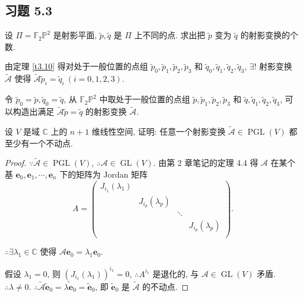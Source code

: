 \documentclass{ctexart}
\begin{document}
\subsection{习题 5.3}
\begin{exercise}%
    设 $\varPi=\mathbb{F}_2\mathbb{P}^2$ 是射影平面, $\tilde{p},\tilde{q}$ 是 $\varPi$ 上不同的点. 求出把 $\tilde{p}$ 变为 $\tilde{q}$ 的射影变换的个数.
\end{exercise}
\begin{solution}
    由定理 \ref{t3.10} 得对处于一般位置的点组 $\tilde{p}_0,\tilde{p}_1,\tilde{p}_2,\tilde{p}_3$ 和 $\tilde{q}_0,\tilde{q}_1,\tilde{q}_2,\tilde{q}_3$, $\exists!$ 射影变换 $\widetilde{\mathcal{A}}$ 使得 $\widetilde{\mathcal{A}}\tilde{p}_i=\tilde{q}_i\ (i=0,1,2,3)$.

    令 $\tilde{p}_0=\tilde{p},\tilde{q}_0=\tilde{q}$, 从 $\mathbb{F}_2\mathbb{P}^2$ 中取处于一般位置的点组 $\tilde{p},\tilde{p}_1,\tilde{p}_2,\tilde{p}_3$ 和 $\tilde{q},\tilde{q}_1,\tilde{q}_2,\tilde{q}_3$, 可以构造出满足 $\widetilde{\mathcal{A}}\tilde{p}=\tilde{q}$ 的射影变换 $\widetilde{\mathcal{A}}$.
\end{solution}
\begin{exercise}%
    设 $V$ 是域 $\mathbb{C}$ 上的 $n+1$ 维线性空间, 证明: 任意一个射影变换 $\widetilde{\mathcal{A}}\in\operatorname{PGL}(V)$ 都至少有一个不动点.
\end{exercise}
\begin{proof}
    $\because\widetilde{\mathcal{A}}\in\operatorname{PGL}(V)$, $\therefore\mathcal{A}\in\operatorname{GL}(V)$. 由第 2 章笔记的定理 4.4 得 $\mathcal{A}$ 在某个基 $\boldsymbol{e}_0,\boldsymbol{e}_1,\cdots,\boldsymbol{e}_n$ 下的矩阵为 Jordan 矩阵
    \[A=\begin{pmatrix}
        J_{i_1}(\lambda_1) \\
        & J_{i_p}(\lambda_p) \\
        && \ddots \\
        &&& J_{i_p}(\lambda_p) \\
    \end{pmatrix}.\]
    
    $\therefore\exists\lambda_1\in\mathbb{C}$ 使得 $\mathcal{A}\boldsymbol{e}_0=\lambda_1\boldsymbol{e}_0$.

    假设 $\lambda_1=0$, 则 $(J_{i_1}(\lambda_1))^{i_1}=0$, $\therefore A^{i_1}$ 是退化的, 与 $\mathcal{A}\in\operatorname{GL}(V)$ 矛盾. $\therefore\lambda\neq0$. $\therefore\widetilde{\mathcal{A}}\tilde{\boldsymbol{e}}_0=\widetilde{\lambda\boldsymbol{e}_0}=\tilde{\boldsymbol{e}}_0$, 即 $\tilde{\boldsymbol{e}}_0$ 是 $\widetilde{\mathcal{A}}$ 的不动点.
\end{proof}
\end{document}
